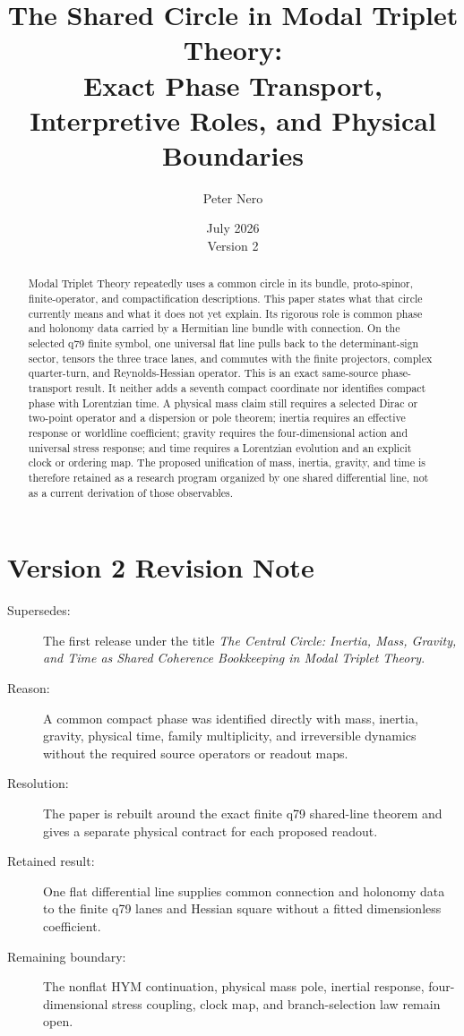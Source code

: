 \documentclass[11pt]{article}
\title{The Shared Circle in Modal Triplet Theory:\\
\large Exact Phase Transport, Interpretive Roles, and Physical Boundaries}
\author{Peter Nero}
\date{July 2026\\Version 2}
\begin{document}
\maketitle

\begin{abstract}
Modal Triplet Theory repeatedly uses a common circle in its bundle,
proto-spinor, finite-operator, and compactification descriptions. This paper
states what that circle currently means and what it does not yet explain. Its
rigorous role is common phase and holonomy data carried by a Hermitian line
bundle with connection. On the selected q79 finite symbol, one universal flat
line pulls back to the determinant-sign sector, tensors the three trace lanes,
and commutes with the finite projectors, complex quarter-turn, and
Reynolds-Hessian operator. This is an exact same-source phase-transport
result. It neither adds a seventh compact coordinate nor identifies compact
phase with Lorentzian time. A physical mass claim still requires a selected
Dirac or two-point operator and a dispersion or pole theorem; inertia requires
an effective response or worldline coefficient; gravity requires the
four-dimensional action and universal stress response; and time requires a
Lorentzian evolution and an explicit clock or ordering map. The proposed
unification of mass, inertia, gravity, and time is therefore retained as a
research program organized by one shared differential line, not as a current
derivation of those observables.
\end{abstract}

\section*{Version 2 Revision Note}
\begin{description}
\item[Supersedes:] The first release under the title
\emph{The Central Circle: Inertia, Mass, Gravity, and Time as Shared
Coherence Bookkeeping in Modal Triplet Theory}.
\item[Reason:] A common compact phase was identified directly with mass,
inertia, gravity, physical time, family multiplicity, and irreversible
dynamics without the required source operators or readout maps.
\item[Resolution:] The paper is rebuilt around the exact finite q79
shared-line theorem and gives a separate physical contract for each proposed
readout.
\item[Retained result:] One flat differential line supplies common connection
and holonomy data to the finite q79 lanes and Hessian square without a fitted
dimensionless coefficient.
\item[Remaining boundary:] The nonflat HYM continuation, physical mass pole,
inertial response, four-dimensional stress coupling, clock map, and
branch-selection law remain open.
\end{description}
\end{document}
